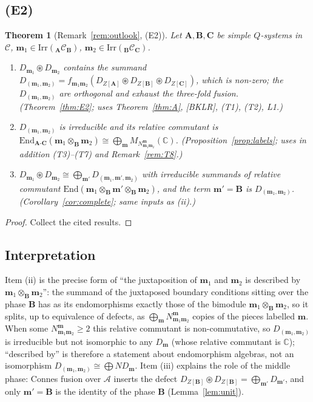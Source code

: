 \documentclass[11pt]{article}
\newtheorem{theorem}{Theorem}[section]
\theoremstyle{definition}
\theoremstyle{remark}
\newcommand{\cA}{\mathcal A}
\newcommand{\bfB}{\mathbf B}
\newcommand{\bfA}{\mathbf A}
\newcommand{\bfC}{\mathbf C}
\newcommand{\cfus}{\circledast}
\begin{document}
\subsection{(E2)}
\begin{theorem}[Remark~\ref{rem:outlook}, (E2)]\label{thm:main}
Let $\bfA,\bfB,\bfC$ be simple $Q$-systems in $\mathcal C$, $\mathbf m_1\in\mathrm{Irr}({}_{\bfA}\mathcal C_{\bfB})$, $\mathbf m_2\in\mathrm{Irr}({}_{\bfB}\mathcal C_{\bfC})$.
\begin{enumerate}[nosep,label=(\roman*)]
\item $D_{\mathbf m_1}\cfus D_{\mathbf m_2}$ contains the summand $D_{(\mathbf m_1,\mathbf m_2)}=f_{\mathbf m_1\mathbf m_2}(D_{Z[\bfA]}\cfus D_{Z[\bfB]}\cfus D_{Z[\bfC]})$, which is non-zero; the $D_{(\mathbf m_1,\mathbf m_2)}$ are orthogonal and exhaust the three-fold fusion. \emph{(Theorem~\ref{thm:E2}; uses Theorem~\ref{thm:A}, [BKLR], (T1), (T2), L1.)}
\item $D_{(\mathbf m_1,\mathbf m_2)}$ is irreducible and its relative commutant is $\mathrm{End}_{\bfA\text{-}\bfC}(\mathbf m_1\otimes_{\bfB}\mathbf m_2)\cong\bigoplus_{\mathbf m}M_{N^{\mathbf m}_{\mathbf m_1\mathbf m_2}}(\mathbb C)$. \emph{(Proposition~\ref{prop:labels}; uses in addition (T3)--(T7) and Remark~\ref{rem:T8}.)}
\item $D_{\mathbf m_1}\cfus D_{\mathbf m_2}\cong\bigoplus_{\mathbf m'}D_{(\mathbf m_1,\mathbf m',\mathbf m_2)}$ with irreducible summands of relative commutant $\mathrm{End}(\mathbf m_1\otimes_{\bfB}\mathbf m'\otimes_{\bfB}\mathbf m_2)$, and the term $\mathbf m'=\bfB$ is $D_{(\mathbf m_1,\mathbf m_2)}$. \emph{(Corollary~\ref{cor:complete}; same inputs as (ii).)}
\end{enumerate}
\end{theorem}
\begin{proof}
Collect the cited results.
\end{proof}

\subsection{Interpretation}
Item (ii) is the precise form of ``the juxtaposition of $\mathbf m_1$ and $\mathbf m_2$ is described by $\mathbf m_1\otimes_{\bfB}\mathbf m_2$'': the summand of the juxtaposed boundary conditions sitting over the phase $\bfB$ has as its endomorphisms exactly those of the bimodule $\mathbf m_1\otimes_{\bfB}\mathbf m_2$, so it splits, up to equivalence of defects, as $\bigoplus_{\mathbf m}N^{\mathbf m}_{\mathbf m_1\mathbf m_2}$ copies of the pieces labelled $\mathbf m$. When some $N^{\mathbf m}_{\mathbf m_1\mathbf m_2}\ge2$ this relative commutant is non-commutative, so $D_{(\mathbf m_1,\mathbf m_2)}$ is irreducible but not isomorphic to any $D_{\mathbf m}$ (whose relative commutant is $\mathbb C$); ``described by'' is therefore a statement about endomorphism algebras, not an isomorphism $D_{(\mathbf m_1,\mathbf m_2)}\cong\bigoplus N D_{\mathbf m}$. Item (iii) explains the role of the middle phase: Connes fusion over $\cA$ inserts the defect $D_{Z[\bfB]}\cfus D_{Z[\bfB]}=\bigoplus_{\mathbf m'}D_{\mathbf m'}$, and only $\mathbf m'=\bfB$ is the identity of the phase $\bfB$ (Lemma~\ref{lem:unit}).
\end{document}

